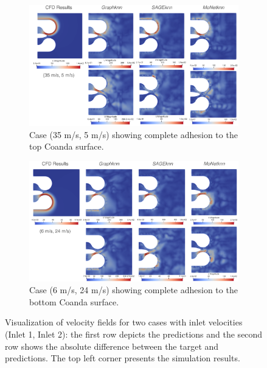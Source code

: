 \begin{figure}[ht]
    \centering
    \begin{subfigure}[b]{14cm}
        \centering
        \includegraphics[width=\textwidth]{images/Methodology/Asset 15.png}
        \caption{Case (35 m/s, 5 m/s) showing complete adhesion to the top Coanda surface.}
        \label{fig:allvel3}
    \end{subfigure}
    \begin{subfigure}[b]{14cm}
        \centering
        \includegraphics[width=\textwidth]{images/Methodology/Asset 14.png}
        \caption{Case (6 m/s, 24 m/s) showing complete adhesion to the bottom Coanda surface.}
        \label{fig:allvel4}
    \end{subfigure}
    \caption{Visualization of velocity fields for two cases with inlet velocities (Inlet 1, Inlet 2): the first row depicts the predictions and the second row shows the absolute difference between the target and predictions. The top left corner presents the simulation results.}
    \label{2vel2}
\end{figure}
